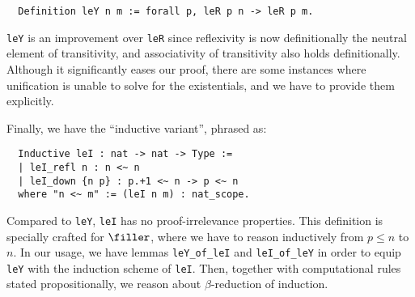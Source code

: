 \documentclass[10pt]{art.cls/art}
\begin{document}
\begin{verbatim}
  Definition leY n m := forall p, leR p n -> leR p m.
\end{verbatim}

\texttt{leY} is an improvement over \texttt{leR} since reflexivity is now definitionally the neutral element of transitivity, and associativity of transitivity also holds definitionally. Although it significantly eases our proof, there are some instances where unification is unable to solve for the existentials, and we have to provide them explicitly.

Finally, we have the ``inductive variant'', phrased as:

\begin{verbatim}
  Inductive leI : nat -> nat -> Type :=
  | leI_refl n : n <~ n
  | leI_down {n p} : p.+1 <~ n -> p <~ n
  where "n <~ m" := (leI n m) : nat_scope.
\end{verbatim}

Compared to \texttt{leY}, \texttt{leI} has no proof-irrelevance properties. This definition is specially crafted for $\filler$, where we have to reason inductively from $p \leq n$ to $n$. In our usage, we have lemmas \texttt{leY\_of\_leI} and \texttt{leI\_of\_leY} in order to equip \texttt{leY} with the induction scheme of \texttt{leI}. Then, together with computational rules stated propositionally, we reason about $\beta$-reduction of induction.

\newpage


\end{document}
